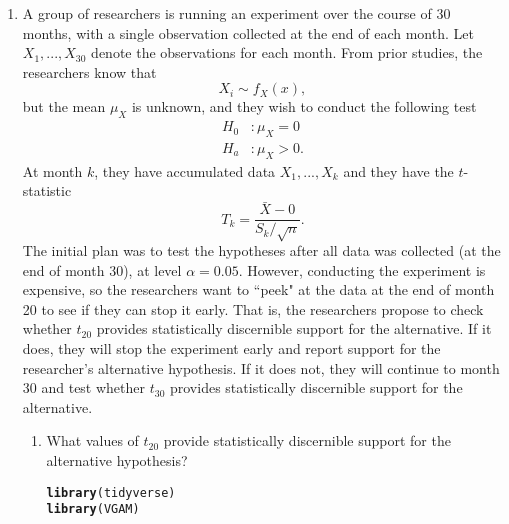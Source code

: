 \documentclass{article}\usepackage[]{graphicx}\usepackage[]{xcolor}
\makeatletter
\newcommand{\hldef}[1]{\textcolor[rgb]{0.345,0.345,0.345}{#1}}%
\newcommand{\hlkwd}[1]{\textcolor[rgb]{0.737,0.353,0.396}{\textbf{#1}}}%
\newenvironment{kframe}{%
 \def\at@end@of@kframe{}%
 \ifinner\ifhmode%
  \def\at@end@of@kframe{\end{minipage}}%
  \begin{minipage}{\columnwidth}%
 \fi\fi%
 \def\FrameCommand##1{\hskip\@totalleftmargin \hskip-\fboxsep
 \colorbox{shadecolor}{##1}\hskip-\fboxsep
     \hskip-\linewidth \hskip-\@totalleftmargin \hskip\columnwidth}%
 \MakeFramed {\advance\hsize-\width
   \@totalleftmargin\z@ \linewidth\hsize
   \@setminipage}}%
 {\par\unskip\endMakeFramed%
 \at@end@of@kframe}
\newenvironment{knitrout}{}{} %
\makeatother
\begin{document}
\begin{enumerate}
\item A group of researchers is running an experiment over the course of 30 months, 
with a single observation collected at the end of each month. Let $X_1, ..., X_{30}$
denote the observations for each month. From prior studies, the researchers know that
\[X_i \sim f_X(x),\]
but the mean $\mu_X$ is unknown, and they wish to conduct the following test
\begin{align*}
H_0&: \mu_X = 0\\
H_a&: \mu_X > 0.
\end{align*}
At month $k$, they have accumulated data $X_1, ..., X_k$ and they have the 
$t$-statistic
\[T_k = \frac{\bar{X} - 0}{S_k/\sqrt{n}}.\]
The initial plan was to test the hypotheses after all data was collected (at the 
end of month 30), at level $\alpha=0.05$. However, conducting the experiment is 
expensive, so the researchers want to ``peek" at the data at the end of month 20 
to see if they can stop it early. That is, the researchers propose to check 
whether $t_{20}$ provides statistically discernible support for the alternative. 
If it does, they will stop the experiment early and report support for the 
researcher's alternative hypothesis. If it does not, they will continue to month 
30 and test whether $t_{30}$ provides statistically discernible support for the
alternative.

\begin{enumerate}
  \item What values of $t_{20}$ provide statistically discernible support for the
  alternative hypothesis?
  
\begin{knitrout}\scriptsize
{}\color{fgcolor}\begin{kframe}
\begin{alltt}
 \hlkwd{library}\hldef{(tidyverse)}
\hlkwd{library}\hldef{(VGAM)}
\end{alltt}


{\ttfamily\noindent\color{warningcolor}{\#\# Warning: package 'VGAM' was built under R version 4.4.3}}

{\ttfamily\noindent\itshape\color{messagecolor}{\#\# Loading required package: stats4}}


\end{kframe}
\end{knitrout}
\end{enumerate}
\end{enumerate}
\end{document}
